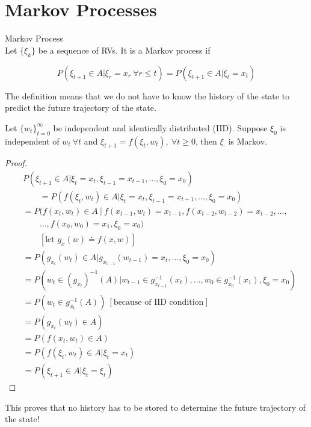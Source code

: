 \section{Markov Processes}
\begin{definition}{Markov Process} \\
Let $\{\xi_k\}$ be a sequence of RVs.
It is a Markov process if

  \begin{equation*}
P(\xi_{t+1}\in A|\xi_r=x_r~\forall r\leq t) = P(\xi_{t+1}\in A|\xi_t=x_t)
  \end{equation*}

\end{definition}
The definition means that we do not have to know the history of the state to predict the future trajectory of the state.

\begin{theorem}
Let ${\{w_t\}}_{t=0}^\infty$ be independent and identically distributed (IID).
Suppose $\xi_0$ is independent of $w_t~\forall t$ and $\xi_{t+1} = f(\xi_t,w_t),~\forall t \geq 0$, then $\xi_\cdot$ is Markov.
\end{theorem}

\begin{proof}
\begin{align*}
&P(\xi_{t+1}\in A | \xi_t=x_t, \xi_{t-1}=x_{t-1}, \ldots, \xi_0=x_0) \\
&\qquad = P(f(\xi_t,w_t)\in A|\xi_t=x_t, \xi_{t-1}=x_{t-1}, \ldots, \xi_0=x_0) \\
&= P(f(x_t,w_t)\in A~|~f(x_{t-1},w_t)=x_{t-1}, f(x_{t-2},w_{t-2})=x_{t-2},\ldots, \\
&\qquad \ldots,f(x_0,w_0)=x_1,\xi_0=x_0) \\
&\qquad [\text{let }g_x(w) \doteq f(x,w)] \\
&= P(g_{x_t}(w_t)\in A|g_{x_{t-1}}(w_{t-1})=x_t,\dots,\xi_0=x_0) \\
&= P(w_t\in{(g_{x_t})}^{-1}(A)|w_{t-1}\in g_{x_{t-1}}^{-1}(x_t),\ldots, w_0\in g_{x_0}^{-1}(x_1),\xi_0=x_0) \\
&= P(w_t\in g_{x_t}^{-1}(A))~[\text{because of IID condition}] \\
&= P(g_{x_t}(w_t)\in A) \\
&= P(f(x_t,w_t)\in A) \\
&= P(f(\xi_t,w_t)\in A|\xi_t=x_t) \\
&= P(\xi_{t+1}\in A|\xi_t=\xi_t)
\end{align*}
\end{proof}
This proves that no history has to be stored to determine the future trajectory of the state!

